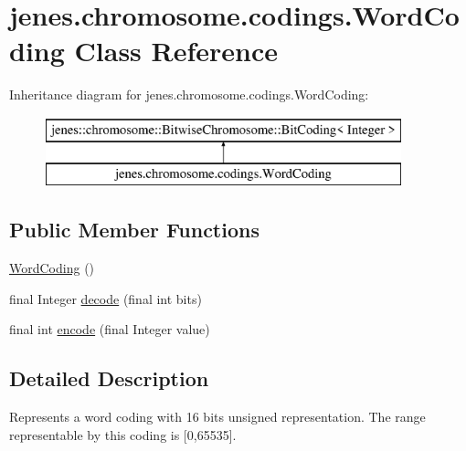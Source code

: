 \hypertarget{classjenes_1_1chromosome_1_1codings_1_1_word_coding}{\section{jenes.\-chromosome.\-codings.\-Word\-Coding Class Reference}
\label{classjenes_1_1chromosome_1_1codings_1_1_word_coding}
}
Inheritance diagram for jenes.\-chromosome.\-codings.\-Word\-Coding\-:\begin{figure}[H]
\begin{center}
\leavevmode
\includegraphics[height=2.000000cm]{classjenes_1_1chromosome_1_1codings_1_1_word_coding}
\end{center}
\end{figure}
\subsection*{Public Member Functions}
\begin{DoxyCompactItemize}
\item 
\hyperlink{classjenes_1_1chromosome_1_1codings_1_1_word_coding_ad9cfa1bcd3dff5005c5fcbd3878777f5}{Word\-Coding} ()
\item 
final Integer \hyperlink{classjenes_1_1chromosome_1_1codings_1_1_word_coding_af92b18ee4d82fabeeadf6bb31a61bee6}{decode} (final int bits)
\item 
final int \hyperlink{classjenes_1_1chromosome_1_1codings_1_1_word_coding_a867ca05daba5c08785ec92abc93c586d}{encode} (final Integer value)
\end{DoxyCompactItemize}


\subsection{Detailed Description}
Represents a word coding with 16 bits unsigned representation. The range representable by this coding is \mbox{[}0,65535\mbox{]}.

